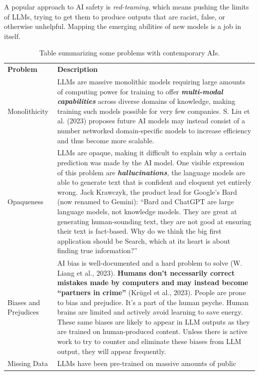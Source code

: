 \documentclass[
  letterpaper,
  DIV=11,
  numbers=noendperiod]{scrartcl}
\begin{document}
A popular approach to AI safety is \emph{red-teaming}, which means
pushing the limits of LLMs, trying to get them to produce outputs that
are racist, false, or otherwise unhelpful. Mapping the emerging
abilities of new models is a job in itself.

\begin{longtable}[]{@{}
  >{\raggedright\arraybackslash}p{}
  >{\raggedright\arraybackslash}p{}@{}}
\caption{Table summarizing some problems with contemporary
AIs.}\tabularnewline
\toprule\noalign{}
\endfirsthead
\endhead
\bottomrule\noalign{}
\endlastfoot
\textbf{Problem} & \textbf{Description} \\
Monolithicity & LLMs are massive monolithic models requiring large
amounts of computing power for training to offer
\textbf{\emph{multi-modal}} \textbf{\emph{capabilities}} across diverse
domains of knowledge, making training such models possible for very few
companies. S. Liu et al. (2023) proposes future AI models may instead
consist of a number networked domain-specific models to increase
efficiency and thus become more scalable. \\
Opaqueness & LLMs are opaque, making it difficult to explain why a
certain prediction was made by the AI model. One visible expression of
this problem are \emph{\textbf{hallucinations},} the language models are
able to generate text that is confident and eloquent yet entirely wrong.
Jack Krawczyk, the product lead for Google's Bard (now renamed to
Gemini): ``Bard and ChatGPT are large language models, not knowledge
models. They are great at generating human-sounding text, they are not
good at ensuring their text is fact-based. Why do we think the big first
application should be Search, which at its heart is about finding true
information?'' \\
Biases and Prejudices & AI bias is well-documented and a hard problem to
solve (W. Liang et al., 2023). \textbf{Humans don't necessarily correct
mistakes made by computers and may instead become ``partners in crime''}
(Krügel et al., 2023). People are prone to bias and prejudice. It's a
part of the human psyche. Human brains are limited and actively avoid
learning to save energy. These same biases are likely to appear in LLM
outputs as they are trained on human-produced content. Unless there is
active work to try to counter and eliminate these biases from LLM
output, they will appear frequently. \\
Missing Data & LLMs have been pre-trained on massive amounts of public

\end{longtable}
\end{document}
